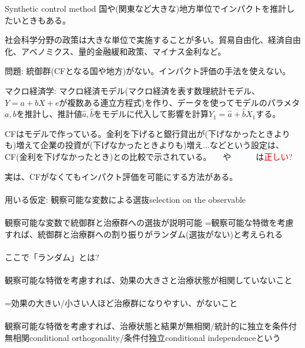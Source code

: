 \begin{frame}[label=SCM]{Synthetic control method}
国や(関東など大きな)地方単位でインパクトを推計したいときもある。
\begin{dinglist}{43}
\vspace{1.0ex}\setlength{\itemsep}{1.0ex}\setlength{\baselineskip}{12pt}
\pause
\item	社会科学分野の政策は大きな単位で実施することが多い。貿易自由化、経済自由化、アベノミクス、量的金融緩和政策、マイナス金利など。
\end{dinglist}
\pause
\vspace{2ex}
問題: 統御群(CFとなる国や地方)がない。インパクト評価の手法を使えない。
\begin{dinglist}{45}
\vspace{1.0ex}\setlength{\itemsep}{1.0ex}\setlength{\baselineskip}{12pt}
\pause
\item	マクロ経済学: マクロ経済モデル(マクロ経済を表す数理統計モデル、$Y=a+bX+e$が複数ある連立方程式)を作り、データを使ってモデルのパラメタ$a, b$を推計し、推計値$\hat{a},\hat{b}$をモデルに代入して影響を計算$Y_{1}=\hat{a}+\hat{b}X_{1}$する。
\pause
\item	CFはモデルで作っている。金利を下げると銀行貸出が(下げなかったときよりも)増えて企業の投資が(下げなかったときよりも)増え...などという設定は、CF(金利を下げなかったとき)との比較で示されている。\pause\textcolor{azure}{$\hat{a},\hat{b}$}や\textcolor{azure}{モデル}は\textcolor{red}{正しい?}
\end{dinglist}
\end{frame}

\begin{frame}{}
実は、CFがなくてもインパクト評価を可能にする方法がある。\\~\\
\pause
用いる仮定: 観察可能な変数による選抜selection on the observable\\~\\
\pause
観察可能な変数で統御群と治療群への選抜が説明可能\pause
=観察可能な特徴を考慮すれば、統御群と治療群への割り振りがランダム(選抜がない)と考えられる\\~\\
\pause
ここで「ランダム」とは?\\~\\
\pause
観察可能な特徴を考慮すれば、効果の大きさと治療状態が相関していないこと\\~\\	
\pause
=効果の大きい/小さい人ほど治療群になりやすい、がないこと\\~\\
\pause
観察可能な特徴を考慮すれば、治療状態と結果が無相関/統計的に独立を条件付無相関conditional orthogonality/条件付独立conditional independenceという
\end{frame}

